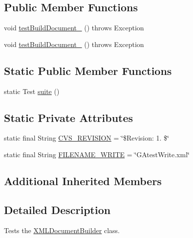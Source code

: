 \subsection*{Public Member Functions}
\begin{DoxyCompactItemize}
\item 
void \hyperlink{classorg_1_1jgap_1_1xml_1_1_x_m_l_document_builder_test_abc69bdf89f9427e385c5c8aa7c73fe18}{test\-Build\-Document\-\_} ()  throws Exception 
\item 
void \hyperlink{classorg_1_1jgap_1_1xml_1_1_x_m_l_document_builder_test_a3bd94e50b221d590066d28b41ba2f001}{test\-Build\-Document\-\_} ()  throws Exception 
\end{DoxyCompactItemize}
\subsection*{Static Public Member Functions}
\begin{DoxyCompactItemize}
\item 
static Test \hyperlink{classorg_1_1jgap_1_1xml_1_1_x_m_l_document_builder_test_ad9346391b22042f75e3f2b779fa37a1c}{suite} ()
\end{DoxyCompactItemize}
\subsection*{Static Private Attributes}
\begin{DoxyCompactItemize}
\item 
static final String \hyperlink{classorg_1_1jgap_1_1xml_1_1_x_m_l_document_builder_test_a5145c012ae35f40eaf22b67b748e4baa}{C\-V\-S\-\_\-\-R\-E\-V\-I\-S\-I\-O\-N} = \char`\"{}\$Revision\-: 1. \$\char`\"{}
\item 
static final String \hyperlink{classorg_1_1jgap_1_1xml_1_1_x_m_l_document_builder_test_ad501d1f2c1a441f20e3e7e2e41eeb32d}{F\-I\-L\-E\-N\-A\-M\-E\-\_\-\-W\-R\-I\-T\-E} = \char`\"{}G\-Atest\-Write.\-xml\char`\"{}
\end{DoxyCompactItemize}
\subsection*{Additional Inherited Members}


\subsection{Detailed Description}
Tests the \hyperlink{classorg_1_1jgap_1_1xml_1_1_x_m_l_document_builder}{X\-M\-L\-Document\-Builder} class.

